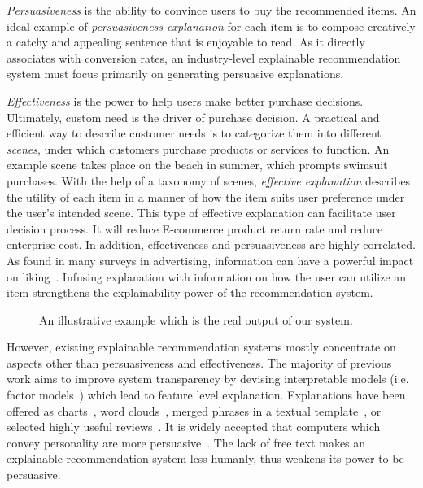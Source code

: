 \documentclass[sigconf]{acmart}
\begin{document}
\textit{Persuasiveness} is the ability to convince users to buy the recommended items. 
An ideal example of \textit{persuasiveness explanation} for each item is to compose creatively a catchy and appealing sentence that is enjoyable to read.
As it directly associates with conversion rates, an industry-level explainable recommendation system must focus primarily on generating persuasive explanations.  

\textit{Effectiveness} is the power to help users make better purchase decisions.
Ultimately, custom need is the driver of purchase decision. 
A practical and efficient way to describe customer needs is to categorize them into different \textit{scenes}, under which customers purchase products or services to function.
An example scene takes place on the beach in summer, which prompts swimsuit purchases. 
With the help of a taxonomy of scenes, \textit{effective explanation} describes the utility of each item in a manner of how the item suits user preference under the user's intended scene.
This type of effective explanation can facilitate user decision process. It will reduce E-commerce product return rate and reduce enterprise cost.
In addition, effectiveness and persuasiveness are highly correlated.  As found in many surveys in advertising, information can have a powerful impact on liking~\cite{}. Infusing explanation with information on how the user can utilize an item strengthens the explainability power of the recommendation system.  

\begin{figure}\label{fig:example}
\caption{An illustrative example which is the real output of our system.}
\end{figure}

However, existing explainable recommendation systems mostly concentrate on aspects other than persuasiveness and effectiveness.  The majority of previous work aims to improve system transparency by devising interpretable models (i.e. factor models~\cite{Zhang2014Explicit,Zhang2015Daily,Wu2015FLAME}) which lead to feature level explanation. Explanations have been offered as charts~\cite{}, word clouds~\cite{Wu2015FLAME}, merged phrases in a textual template~\cite{Zhang2014Explicit,Zhang2015Daily}, or selected highly useful reviews~\cite{Chen2018Neural}. 
It is widely accepted that computers which convey personality are more persuasive~\cite{Yoo2011Creating}. The lack of free text makes an explainable recommendation system less humanly, thus weakens its power to be persuasive. 
\end{document}
